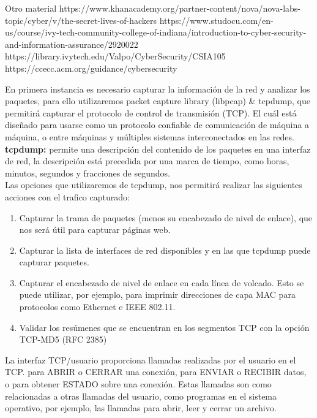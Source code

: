 Otro material 
https://www.khanacademy.org/partner-content/nova/nova-labs-topic/cyber/v/the-secret-lives-of-hackers
https://www.studocu.com/en-us/course/ivy-tech-community-college-of-indiana/introduction-to-cyber-security-and-information-assurance/2920022
https://library.ivytech.edu/Valpo/CyberSecurity/CSIA105
https://ccecc.acm.org/guidance/cybersecurity


\color{red}
En primera instancia es necesario capturar la información de la red y analizar los paquetes, para ello utilizaremos packet capture library (libpcap) & tcpdump, que permitirá capturar el protocolo de control de transmisión (TCP). El cuál está diseñado para usarse como un protocolo confiable de comunicación de máquina a máquina, o entre máquinas y múltiples sistemas interconectados en las redes.\\

\textbf{tcpdump:} permite una descripción del contenido de los paquetes en una interfaz de red, la descripción está precedida por una marca de tiempo, como horas, minutos, segundos y fracciones de segundos. \cite{noauthor_tcpdumplibpcap_nodate} \\

Las opciones que utilizaremos de tcpdump, nos permitirá realizar las siguientes acciones con el trafico capturado: 

\begin{enumerate}
    \item Capturar la trama de paquetes (menos su encabezado de nivel de enlace), que nos será útil para capturar páginas web. 
    \item Capturar la lista de interfaces de red disponibles y en las que tcpdump puede capturar paquetes. 
    \item Capturar el encabezado de nivel de enlace en cada línea de volcado. Esto se puede utilizar, por ejemplo, para imprimir direcciones de capa MAC para protocolos como Ethernet e IEEE 802.11. 
    \item Validar los resúmenes que se encuentran en los segmentos TCP con la opción TCP-MD5 (RFC 2385)
\end{enumerate}

La interfaz TCP/usuario proporciona llamadas realizadas por el usuario en el TCP. para ABRIR o CERRAR una conexión, para ENVIAR o RECIBIR datos, o para obtener ESTADO sobre una conexión. Estas llamadas son como relacionadas a otras llamadas del usuario, como  programas en el sistema operativo, por ejemplo, las llamadas para abrir, leer y cerrar un archivo.\\

